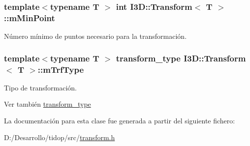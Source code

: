 \subsubsection[{\texorpdfstring{m\+Min\+Point}{mMinPoint}}]{\setlength{\rightskip}{0pt plus 5cm}template$<$typename T $>$ int {\bf I3\+D\+::\+Transform}$<$ T $>$\+::m\+Min\+Point\hspace{0.3cm}{\ttfamily [protected]}}\hypertarget{class_i3_d_1_1_transform_a087716ea2e7fa31127003e50479ed01e}{}\label{class_i3_d_1_1_transform_a087716ea2e7fa31127003e50479ed01e}


Número mínimo de puntos necesario para la transformación. 

\subsubsection[{\texorpdfstring{m\+Trf\+Type}{mTrfType}}]{\setlength{\rightskip}{0pt plus 5cm}template$<$typename T $>$ {\bf transform\+\_\+type} {\bf I3\+D\+::\+Transform}$<$ T $>$\+::m\+Trf\+Type\hspace{0.3cm}{\ttfamily [protected]}}\hypertarget{class_i3_d_1_1_transform_a1d5c0d6ea45417608b00316a08f164d7}{}\label{class_i3_d_1_1_transform_a1d5c0d6ea45417608b00316a08f164d7}


Tipo de transformación. 

\begin{DoxySeeAlso}{Ver también}
\hyperlink{group__trf_group_ga175e1580b1ecbc0710ad48060d56c2a3}{transform\+\_\+type} 
\end{DoxySeeAlso}


La documentación para esta clase fue generada a partir del siguiente fichero\+:\begin{DoxyCompactItemize}
\item 
D\+:/\+Desarrollo/tidop/src/\hyperlink{transform_8h}{transform.\+h}\end{DoxyCompactItemize}
